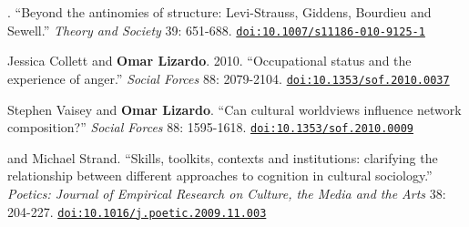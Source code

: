 
. ``Beyond the antinomies of structure: Levi-Strauss, Giddens, Bourdieu and Sewell.''  {\em Theory and Society} 39:  651-688. \newline \href{https://doi.org/10.1007/s11186-010-9125-1}{\nolinkurl{doi:10.1007/s11186-010-9125-1}}

\ind Jessica Collett and {\bf Omar Lizardo}. 2010. ``Occupational status and the experience of anger.''  {\em Social Forces} 88: 2079-2104. \href{https://doi.org/10.1353/sof.2010.0037}{\nolinkurl{doi:10.1353/sof.2010.0037}}

\ind Stephen Vaisey and {\bf Omar Lizardo}. ``Can cultural worldviews influence network composition?''  {\em Social Forces} 88: 1595-1618. \href{https://doi.org/10.1353/sof.2010.0009}{\nolinkurl{doi:10.1353/sof.2010.0009}}

 and Michael Strand. ``Skills, toolkits, contexts and institutions: clarifying the relationship between different approaches to  cognition in cultural sociology.''  {\em Poetics: Journal of Empirical Research on Culture, the Media and the Arts} 38: 204-227. \href{https://doi.org/10.1016/j.poetic.2009.11.003}{\nolinkurl{doi:10.1016/j.poetic.2009.11.003}}
